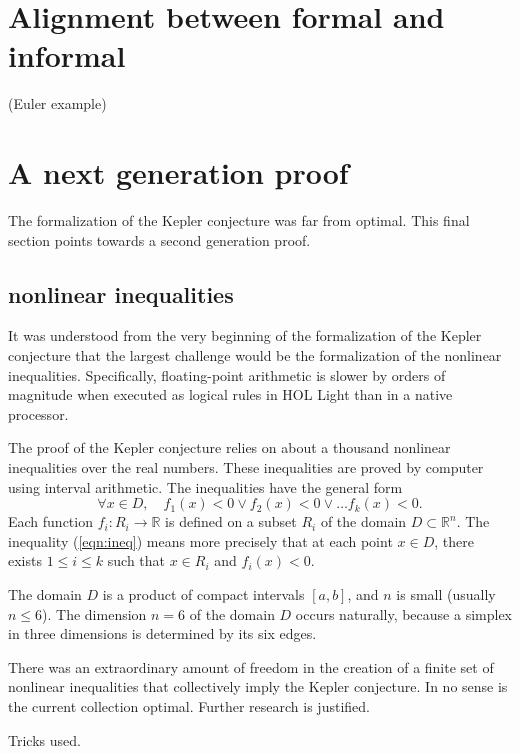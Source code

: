 \documentclass{amsart}
\newcommand{\ring}[1]{\mathbb{#1}}
\begin{document}
\section{Alignment between formal and informal}

(Euler example)

\section{A next generation proof}

The formalization of the Kepler conjecture was far from optimal.  This
final section points towards a second generation proof.

\subsection{nonlinear inequalities}
It was understood from the very beginning of the formalization of the
Kepler conjecture that the largest challenge would be the
formalization of the nonlinear inequalities.  Specifically,
floating-point arithmetic is slower by orders of magnitude when
executed as logical rules in HOL Light than in a native processor.

The proof of the Kepler conjecture relies on about a thousand
nonlinear inequalities over the real numbers.  These inequalities
are proved by computer using interval arithmetic. The inequalities
have the general form 
\begin{equation}\label{eqn:ineq}
\forall x \in D,\quad f_1(x) < 0 \lor f_2(x) < 0 \lor \ldots f_k(x) < 0.
\end{equation}
Each function $f_i : R_i \to \ring{R}$ is defined on a subset $R_i$ of the
domain $D\subset \ring{R}^n$.
The inequality (\ref{eqn:ineq}) means more precisely that 
at each point $x\in D$, there exists $1\le i\le k$ such that
$x \in R_i$ and $f_i(x) < 0$. 

The domain $D$ is a product of 
compact intervals $[a,b]$, and $n$ is small (usually $n\le 6$).  
The dimension $n=6$ of the domain $D$ occurs naturally, because a
simplex in three dimensions is determined by its six edges.

There was an extraordinary amount of freedom in the creation
of a finite set of nonlinear inequalities that collectively imply
the Kepler conjecture.  In no sense is the current collection
optimal.  Further research is justified.



Tricks used.
\end{document}
